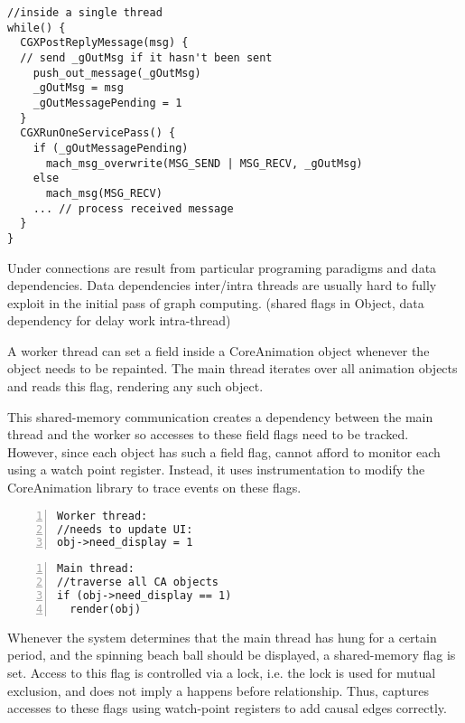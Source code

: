 {\footnotesize \begin{verbatim}
//inside a single thread
while() {
  CGXPostReplyMessage(msg) {
  // send _gOutMsg if it hasn't been sent
    push_out_message(_gOutMsg)
    _gOutMsg = msg
    _gOutMessagePending = 1
  }
  CGXRunOneServicePass() {
    if (_gOutMessagePending)
      mach_msg_overwrite(MSG_SEND | MSG_RECV, _gOutMsg)
    else
      mach_msg(MSG_RECV)
    ... // process received message
  }
}
\end{verbatim}
}

Under connections are result from particular programing paradigms and data
dependencies. Data dependencies inter/intra threads are usually hard to fully
exploit in the initial pass of graph computing. (shared flags in Object, data
dependency for delay work intra-thread)

A worker thread can set a field  inside a CoreAnimation object
whenever the object needs to be repainted. The main thread iterates over all
animation objects and reads this flag, rendering any such object.

This shared-memory communication creates a dependency between the main thread
and the worker so accesses to these field flags need to be tracked. However,
since each object has such a field flag, \xxx cannot afford to monitor each
using a watch point register. Instead, it uses instrumentation to modify the
CoreAnimation library to trace events on these flags.

{\footnotesize\begin{BVerbatim}[baseline=c,numbers=left]
Worker thread:
//needs to update UI:
obj->need_display = 1
\end{BVerbatim}
}
\quad
{\footnotesize\begin{BVerbatim}[baseline=c,numbers=left]
Main thread: 
//traverse all CA objects
if (obj->need_display == 1)
  render(obj)
\end{BVerbatim}
}
\bigskip

Whenever the system determines that the main thread has hung for a certain
period, and the spinning beach ball should be displayed, a shared-memory flag
is set. Access to this flag is controlled via a lock, i.e. the lock is used for
mutual exclusion, and does not imply a happens before relationship. Thus, \xxx
captures accesses to these flags using watch-point registers to add causal edges
correctly.

